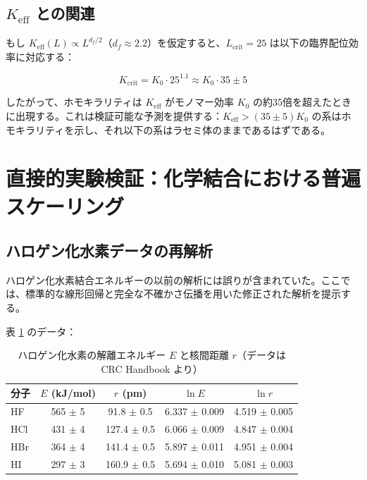 \documentclass[11pt,a4paper]{article}
\newcommand{\Keff}{K_{\mathrm{eff}}}
\newcommand{\df}{d_{\!f}}
\newcommand{\Kcrit}{K_{\mathrm{crit}}}
\begin{document}
	\subsection{$\Keff$ との関連}
	
	もし $\Keff(L) \propto L^{\df/2}$（$\df \approx 2.2$）を仮定すると、$L_{\text{crit}} = 25$ は以下の臨界配位効率に対応する：
	
	\begin{equation}
		\Kcrit = K_0 \cdot 25^{1.1} \approx K_0 \cdot 35 \pm 5
		\label{eq:Kcrit-from-L}
	\end{equation}
	
	したがって、ホモキラリティは $\Keff$ がモノマー効率 $K_0$ の約35倍を超えたときに出現する。これは検証可能な予測を提供する：$\Keff > (35 \pm 5) K_0$ の系はホモキラリティを示し、それ以下の系はラセミ体のままであるはずである。
	
	\section{直接的実験検証：化学結合における普遍スケーリング}
	\label{sec:experimental-verification}
	
	\subsection{ハロゲン化水素データの再解析}
	
	ハロゲン化水素結合エネルギーの以前の解析には誤りが含まれていた。ここでは、標準的な線形回帰と完全な不確かさ伝播を用いた修正された解析を提示する。
	
	表 \ref{tab:HX} のデータ：
	
	\begin{table}[htbp]
		\centering
		\caption{ハロゲン化水素の解離エネルギー $E$ と核間距離 $r$（データは CRC Handbook より）}
		\label{tab:HX}
		\begin{tabular}{lcccc}
			\toprule
			分子 & $E$ (kJ/mol) & $r$ (pm) & $\ln E$ & $\ln r$ \\
			\midrule
			HF & 565 $\pm$ 5 & 91.8 $\pm$ 0.5 & 6.337 $\pm$ 0.009 & 4.519 $\pm$ 0.005 \\
			HCl & 431 $\pm$ 4 & 127.4 $\pm$ 0.5 & 6.066 $\pm$ 0.009 & 4.847 $\pm$ 0.004 \\
			HBr & 364 $\pm$ 4 & 141.4 $\pm$ 0.5 & 5.897 $\pm$ 0.011 & 4.951 $\pm$ 0.004 \\
			HI  & 297 $\pm$ 3 & 160.9 $\pm$ 0.5 & 5.694 $\pm$ 0.010 & 5.081 $\pm$ 0.003 \\
			\bottomrule
		\end{tabular}
	\end{table}
	
\end{document}

